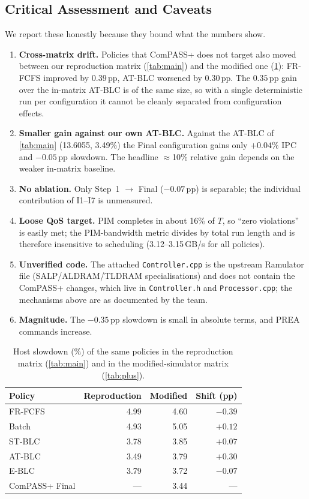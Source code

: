 \documentclass[conference]{IEEEtran}
\newcommand{\cmd}[1]{\texttt{\footnotesize #1}}
\begin{document}
\subsection{Critical Assessment and Caveats}\label{sec:plus-caveats}
We report these honestly because they bound what the numbers show.
\begin{enumerate}
\item \textbf{Cross-matrix drift.} Policies that ComPASS+ does not target also moved between our reproduction matrix (\cref{tab:main}) and the modified one (\cref{tab:drift}): FR-FCFS improved by 0.39\,pp, AT-BLC worsened by 0.30\,pp. The $0.35$\,pp gain over the in-matrix AT-BLC is of the same size, so with a single deterministic run per configuration it cannot be cleanly separated from configuration effects.
\item \textbf{Smaller gain against our own AT-BLC.} Against the AT-BLC of \cref{tab:main} (13.6055, 3.49\%) the Final configuration gains only $+0.04\%$ IPC and $-0.05$\,pp slowdown. The headline $\approx$10\% relative gain depends on the weaker in-matrix baseline.
\item \textbf{No ablation.} Only Step~1 $\to$ Final ($-0.07$\,pp) is separable; the individual contribution of I1--I7 is unmeasured.
\item \textbf{Loose QoS target.} PIM completes in about 16\% of $T$, so ``zero violations'' is easily met; the PIM-bandwidth metric divides by total run length and is therefore insensitive to scheduling (3.12--3.15\,GB/s for all policies).
\item \textbf{Unverified code.} The attached \cmd{Controller.cpp} is the upstream Ramulator file (SALP/ALDRAM/TLDRAM specialisations) and does not contain the ComPASS+ changes, which live in \cmd{Controller.h} and \cmd{Processor.cpp}; the mechanisms above are as documented by the team.
\item \textbf{Magnitude.} The $-0.35$\,pp slowdown is small in absolute terms, and PREA commands increase.
\end{enumerate}

\begin{table}[!tbp]
\centering
\caption{Host slowdown (\%) of the same policies in the reproduction matrix (\cref{tab:main}) and in the modified-simulator matrix (\cref{tab:plus}).}\label{tab:drift}
\footnotesize
\begin{tabular}{@{}lrrr@{}}
\toprule
\textbf{Policy} & \textbf{Reproduction} & \textbf{Modified} & \textbf{Shift (pp)}\\
\midrule
FR-FCFS  & 4.99 & 4.60 & $-0.39$\\
Batch    & 4.93 & 5.05 & $+0.12$\\
ST-BLC   & 3.78 & 3.85 & $+0.07$\\
AT-BLC   & 3.49 & 3.79 & $+0.30$\\
E-BLC    & 3.79 & 3.72 & $-0.07$\\
ComPASS+ Final & --- & 3.44 & ---\\
\bottomrule
\end{tabular}
\end{table}
\end{document}
